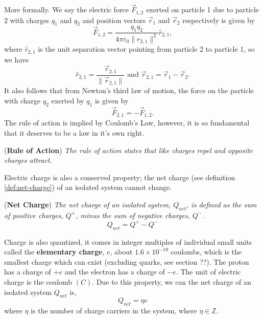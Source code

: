 More formally. We say the electric force $\vec{F}_{1,2}$ exerted on particle 1 due to particle 2 with charges $q_1$ and $q_2$ and position vectors $\vec{r}_1$ and $\vec{r}_2$ respectively is given by
\begin{equation}
    \label{eq:coulombs-law}
    \vec{F}_{1,2} = \frac{q_1 q_2}{4 \pi \varepsilon_0 \| r_{2,1} \|^2} \hat{r}_{2,1},
\end{equation}
where $\hat{r}_{2,1}$ is the unit separation vector pointing from particle 2 to particle 1, so we have
\begin{equation}
    \hat{r}_{2,1} = \frac{\vec{r}_{2,1}}{\| \vec{r}_{2,1}\|} \text{ and } \vec{r}_{2,1} = \vec{r}_1 - \vec{r}_2.
\end{equation}
It also follows that from Newton's third law of motion, the force on the particle with charge $q_2$ exerted by $q_1$ is given by
\begin{equation}
    \vec{F}_{2, 1} = - \vec{F}_{1, 2}.
\end{equation}
The rule of action is implied by Coulomb's Law, however, it is so fundamental that it deserves to be a law in it's own right.
\begin{theorem}{(\textbf{Rule of Action})}
\textit{The rule of action states that like charges repel and opposite charges attract.}
\end{theorem}
Electric charge is also a conserved property; the net charge (see definition \ref{def:net-charge}) of an isolated system cannot change.
\begin{definition}{(\textbf{Net Charge})}
\label{def:net-charge}
\textit{The net charge of an isolated system, $Q_{net}$, is defined as the sum of positive charges, $Q^{+}$, minus the sum of negative charges, $Q^{-}$.}
\begin{equation}
    Q_{net} = Q^{+} - Q^{-}
\end{equation}
\end{definition}

Charge is also quantized, it comes in integer multiples of individual small units called the \textbf{elementary charge}, $e$, about $1.6 \times 10^{-19}$ coulombs, which is the smallest charge which can exist (excluding quarks, see section ??). The proton has a charge of $+e$ and the electron has a charge of $-e$. The unit of electric charge is the coulomb $(C)$. Due to this property, we can the net charge of an isolated system $Q_{net}$ is,
\begin{equation}
    Q_{net} = \eta e
\end{equation}
where $\eta$ is the number of charge carriers in the system, where $\eta \in \mathbb{Z}$.

